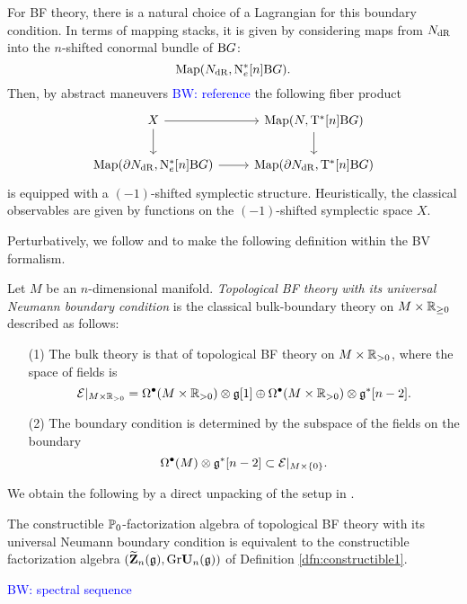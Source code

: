 \documentclass[11pt]{amsart}
\numberwithin{equation}{section}
\def\brian{\textcolor{blue}{BW: }\textcolor{blue}}
\begin{document}
For BF theory, there is a natural choice of a Lagrangian for this boundary condition. 
In terms of mapping stacks, it is given by considering maps from $N_{\rm dR}$ into the $n$-shifted conormal bundle of ${\rm B} G$:
\[
{\rm Map}(N_{\rm dR} , {\rm N}^*_e [n] {\rm B}G) .
\]
Then, by abstract maneuvers \brian{reference} the following fiber product
\[
\begin{tikzcd}
X \ar[r] \ar[d] & {\rm Map} (N , {\rm T}^* [n] {\rm B} G) \ar[d] \\
{\rm Map}(\partial N_{\rm dR} , {\rm N}^*_e  [n] {\rm B}G) \ar[r] & {\rm Map}(\partial N_{\rm dR} , {\rm T}^*[n]  {\rm B}G)
\end{tikzcd}
\]
is equipped with a $(-1)$-shifted symplectic structure. 
Heuristically, the classical observables are given by functions on the $(-1)$-shifted symplectic space $X$.

Perturbatively, we follow \cite{ButsonYoo} and \cite{Eugene} to make the following definition within the BV formalism.

\begin{dfn}
Let $M$ be an $n$-dimensional manifold.
{\em Topological BF theory with its universal Neumann boundary condition} is the classical bulk-boundary theory on $M \times \mathbb R_{\geq 0}$ described as follows:
\begin{itemize}
\item[(1)] 
The bulk theory is that of topological BF theory on $M \times \mathbb R_{>0}$, where the space of fields is 
\[
\mathcal E|_{M \times \mathbb R_{>0}} = \Omega^{\bullet} (M \times \mathbb R_{>0}) \otimes \mathfrak g [1] \oplus \Omega^{\bullet} (M \times \mathbb R_{>0}) \otimes \mathfrak g^* [n-2] .
\]
\item[(2)] 
The boundary condition is determined by the subspace of the fields on the boundary
\[
\Omega^{\bullet} (M) \otimes \mathfrak g^* [n-2] \subset \mathcal E|_{M \times \{0\}} .
\]
\end{itemize}
\end{dfn}

We obtain the following by a direct unpacking of the setup in \cite{Eugene}. 

\begin{prp}
The constructible $\mathbb P_0$-factorization algebra of topological BF theory with its universal Neumann boundary condition is equivalent to the constructible factorization algebra $(\widetilde{\mathbf Z}_n (\mathfrak g), {\rm Gr} \mathbf U_n (\mathfrak g))$ of Definition \ref{dfn:constructible1}. 
\end{prp}

\brian{spectral sequence}
\end{document}
